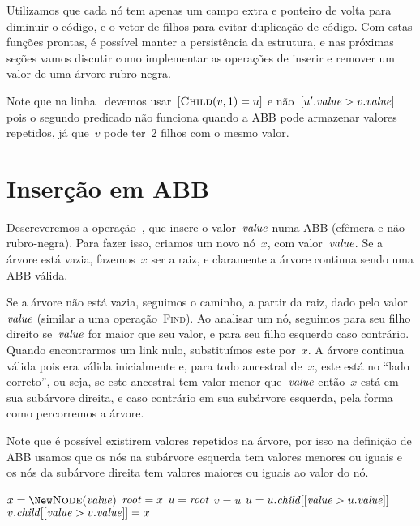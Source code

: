 \documentclass[main.tex]{subfiles}
\begin{document}
Utilizamos que cada nó tem apenas um campo extra e ponteiro de volta para diminuir o código, e o vetor de filhos para evitar duplicação de código. Com estas funções prontas, é possível manter a persistência da estrutura, e nas próximas seções vamos discutir como implementar as operações de inserir e remover um valor de uma árvore rubro-negra.

Note que na linha~ devemos usar~$[\Call{Child}{v, 1} = u]$ e não~$[u'.\mathit{value} > v.\mathit{value}]$ pois o segundo predicado não funciona quando a ABB pode armazenar valores repetidos, já que~$v$ pode ter~2 filhos com o mesmo valor.

\section{Inserção em ABB}

Descreveremos a operação~, que insere o valor~$\mathit{value}$ numa ABB (efêmera e não rubro-negra). Para fazer isso, criamos um novo nó~$x$, com valor~$\mathit{value}$. Se a árvore está vazia, fazemos~$x$ ser a raiz, e claramente a árvore continua sendo uma ABB válida.

Se a árvore não está vazia, seguimos o caminho, a partir da raiz, dado pelo valor~$\mathit{value}$ (similar a uma operação~\textsc{Find}). Ao analisar um nó, seguimos para seu filho direito se~$\mathit{value}$ for maior que seu valor, e para seu filho esquerdo caso contrário. Quando encontrarmos um link nulo, substituímos este por~$x$. A árvore continua válida pois era válida inicialmente e, para todo ancestral de~$x$, este está no ``lado correto'', ou seja, se este ancestral tem valor menor que~$\mathit{value}$ então~$x$ está em sua subárvore direita, e caso contrário em sua subárvore esquerda, pela forma como percorremos a árvore.

Note que é possível existirem valores repetidos na árvore, por isso na definição de ABB usamos que os nós na subárvore esquerda tem valores menores ou iguais e os nós da subárvore direita tem valores maiores ou iguais ao valor do nó.

\begin{algorithm}
\begin{algorithmic}[1]

	\State $x = \New \Call{Node}{\val}$ 
		\State $\mathit{root} = x$
	\Else
		\State $u = \mathit{root}$
		 
			\State $v = u$
			\State $u = u.\mathit{child}[[\mathit{value} > u.\mathit{value}]]$
		\EndWhile
		\State $v.\mathit{child}[[\mathit{value} > v.\mathit{value}]] = x$
	\EndIf
\EndFunction

\end{algorithmic}
\end{algorithm}
\end{document}
